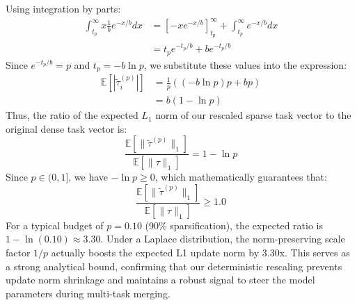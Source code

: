 Using integration by parts:
\begin{align}
\int_{t_p}^{\infty} x \frac{1}{b} e^{-x/b} dx &= \left[ -x e^{-x/b} \right]_{t_p}^{\infty} + \int_{t_p}^{\infty} e^{-x/b} dx \nonumber \\
&= t_p e^{-t_p/b} + b e^{-t_p/b}
\end{align}
Since $e^{-t_p/b} = p$ and $t_p = -b \ln p$, we substitute these values into the expression:
\begin{align}
\mathbb{E}[|\tilde{\tau}_i^{(p)}|] &= \frac{1}{p} \left( (-b \ln p) p + b p \right) \nonumber \\
&= b (1 - \ln p)
\end{align}
Thus, the ratio of the expected $L_1$ norm of our rescaled sparse task vector to the original dense task vector is:
\begin{equation}
\frac{\mathbb{E}[\|\tilde{\tau}^{(p)}\|_1]}{\mathbb{E}[\|\tau\|_1]} = 1 - \ln p
\end{equation}
Since $p \in (0, 1]$, we have $-\ln p \geq 0$, which mathematically guarantees that:
\begin{equation}
\frac{\mathbb{E}[\|\tilde{\tau}^{(p)}\|_1]}{\mathbb{E}[\|\tau\|_1]} \geq 1.0
\end{equation}
For a typical budget of $p = 0.10$ (90\% sparsification), the expected ratio is $1 - \ln(0.10) \approx 3.30$. Under a Laplace distribution, the norm-preserving scale factor $1/p$ actually boosts the expected L1 update norm by 3.30x. This serves as a strong analytical bound, confirming that our deterministic rescaling prevents update norm shrinkage and maintains a robust signal to steer the model parameters during multi-task merging.


